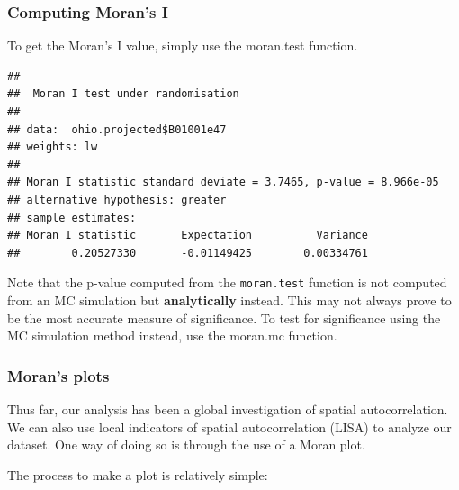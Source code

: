 \documentclass[
]{article}
\newenvironment{Shaded}{\begin{snugshade}}{\end{snugshade}}
\newcommand{\AttributeTok}[1]{\textcolor[rgb]{0.13,0.29,0.53}{#1}}
\newcommand{\CommentTok}[1]{\textcolor[rgb]{0.56,0.35,0.01}{\textit{#1}}}
\newcommand{\ConstantTok}[1]{\textcolor[rgb]{0.56,0.35,0.01}{#1}}
\newcommand{\FunctionTok}[1]{\textcolor[rgb]{0.13,0.29,0.53}{\textbf{#1}}}
\newcommand{\NormalTok}[1]{#1}
\newcommand{\SpecialCharTok}[1]{\textcolor[rgb]{0.81,0.36,0.00}{\textbf{#1}}}
\begin{document}
\subsubsection{Computing Moran's I}\label{computing-morans-i}

To get the Moran's I value, simply use the moran.test function.

\begin{Shaded}
\end{Shaded}

\begin{verbatim}
## 
##  Moran I test under randomisation
## 
## data:  ohio.projected$B01001e47  
## weights: lw    
## 
## Moran I statistic standard deviate = 3.7465, p-value = 8.966e-05
## alternative hypothesis: greater
## sample estimates:
## Moran I statistic       Expectation          Variance 
##        0.20527330       -0.01149425        0.00334761
\end{verbatim}

Note that the p-value computed from the \texttt{moran.test} function is
not computed from an MC simulation but \textbf{analytically} instead.
This may not always prove to be the most accurate measure of
significance. To test for significance using the MC simulation method
instead, use the moran.mc function.

\subsubsection{Moran's plots}\label{morans-plots}

Thus far, our analysis has been a global investigation of spatial
autocorrelation. We can also use local indicators of spatial
autocorrelation (LISA) to analyze our dataset. One way of doing so is
through the use of a Moran plot.

The process to make a plot is relatively simple:

\begin{Shaded}
\end{Shaded}
\end{document}
